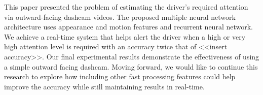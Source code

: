 This paper presented the problem of estimating the driver's required attention via outward-facing dashcam videos. The proposed multiple neural network architecture uses appearance and motion features and recurrent neural network. We achieve a real-time system that helps alert the driver when a high or very high attention level is required with an accuracy twice that of <<insert accuracy>>. Our final experimental results demonstrate the effectiveness of using a simple outward facing dashcam.
Moving forward, we would like to continue this research to explore how including other fast processing features could help improve the accuracy while still maintaining results in real-time.
